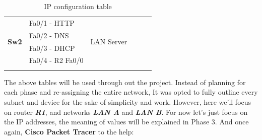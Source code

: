 \documentclass[11pt,a4paper]{report}
\begin{document}
\begin{center}
\begin{longtable}{@{}llllll@{}}
                \multirow{4}{*}{\textbf{Sw2}}                      & Fa0/1 - HTTP                                             & \multirow{4}{*}{LAN Server}                           & \multicolumn{1}{c}{}                             & \multicolumn{1}{c}{}                                      & \multicolumn{1}{c}{}                                  \\
                                                                   & Fa0/2 - DNS                                              &                                                       & \multicolumn{1}{c}{}                             & \multicolumn{1}{c}{}                                      & \multicolumn{1}{c}{}                                  \\
                                                                   & Fa0/3 - DHCP                                             &                                                       & \multicolumn{1}{c}{}                             & \multicolumn{1}{c}{}                                      & \multicolumn{1}{c}{}                                  \\
                                                                   & Fa0/4 - R2 Fa0/0                                         &                                                       & \multicolumn{1}{c}{}                             & \multicolumn{1}{c}{}                                      & \multicolumn{1}{c}{}                                  \\* \bottomrule
                \caption{IP configuration table}
                \label{tab:deviceiptable}\\
                \end{longtable}
        \end{center}

        The above tables will be used through out the project. Instead of planning for each phase and re-assigning the entire network, It was opted to fully outline every subnet and device for the sake of simplicity and work.
        However, here we'll focus on router \textbf{\textit{R1}}, and networks \textbf{\textit{LAN A}} and \textbf{\textit{LAN B}}. For now let's just focus on the IP addresses, the meaning of values will be explained in Phase 3.
        And once again, \textbf{Cisco Packet Tracer} to the help:
\end{document}
